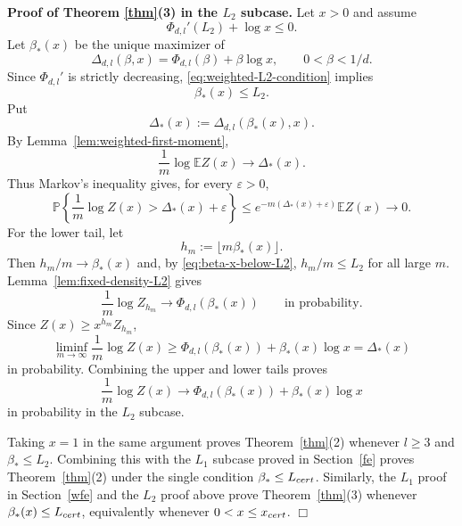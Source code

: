 \documentclass[11pt]{amsart}
\theoremstyle{plain}
\numberwithin{equation}{section}
\numberwithin{theorem}{section}
\numberwithin{figure}{section}
\begin{document}
\noindent\textbf{Proof of Theorem \ref{thm}(3) in the $L_2$ subcase.}
Let \(x>0\) and assume
\begin{equation}\label{eq:weighted-L2-condition}
  \Phi_{d,l}'(L_2)+\log x\le0.
\end{equation}
Let \(\beta_*(x)\) be the unique maximizer of
\[
  \Delta_{d,l}(\beta,x)=\Phi_{d,l}(\beta)+\beta\log x,
  \qquad 0<\beta<1/d.
\]
Since \(\Phi_{d,l}'\) is strictly decreasing, \eqref{eq:weighted-L2-condition} implies
\begin{equation}\label{eq:beta-x-below-L2}
  \beta_*(x)\le L_2.
\end{equation}
Put
\[
  \Delta_*(x):=\Delta_{d,l}(\beta_*(x),x).
\]
By Lemma~\ref{lem:weighted-first-moment},
\begin{equation}\label{eq:section7-weighted-first-moment}
  \frac1m\log\mathbb E Z(x)\longrightarrow \Delta_*(x).
\end{equation}
Thus Markov's inequality gives, for every \(\varepsilon>0\),
\[
  \mathbb P\left\{\frac1m\log Z(x)>\Delta_*(x)+\varepsilon\right\}
  \le e^{-m(\Delta_*(x)+\varepsilon)}\mathbb E Z(x)\longrightarrow0.
\]
For the lower tail, let
\[
  h_m:=\lfloor m\beta_*(x)\rfloor.
\]
Then \(h_m/m\to\beta_*(x)\) and, by \eqref{eq:beta-x-below-L2}, \(h_m/m\le L_2\) for all
large \(m\).  Lemma~\ref{lem:fixed-density-L2} gives
\[
  \frac1m\log Z_{h_m}\longrightarrow \Phi_{d,l}(\beta_*(x))
  \qquad\text{in probability}.
\]
Since \(Z(x)\ge x^{h_m}Z_{h_m}\),
\[
  \liminf_{m\to\infty}\frac1m\log Z(x)
  \ge \Phi_{d,l}(\beta_*(x))+\beta_*(x)\log x
  =\Delta_*(x)
\]
in probability.  Combining the upper and lower tails proves
\[
  \frac1m\log Z(x)\longrightarrow
  \Phi_{d,l}(\beta_*(x))+\beta_*(x)\log x
\]
in probability in the $L_2$ subcase.

Taking $x=1$ in the same argument proves Theorem~\ref{thm}(2) whenever
$l\ge3$ and $\beta_*\le L_2$.  Combining this with the $L_1$ subcase proved in
Section~\ref{fe} proves Theorem~\ref{thm}(2) under the single condition
$\beta_*\le L_{\rm cert}$.  Similarly, the $L_1$ proof in Section~\ref{wfe}
and the $L_2$ proof above prove Theorem~\ref{thm}(3) whenever
$\beta_*(x)\le L_{\rm cert}$, equivalently whenever $0<x\le x_{\rm cert}$.
\hfill\(\Box\)
\end{document}
